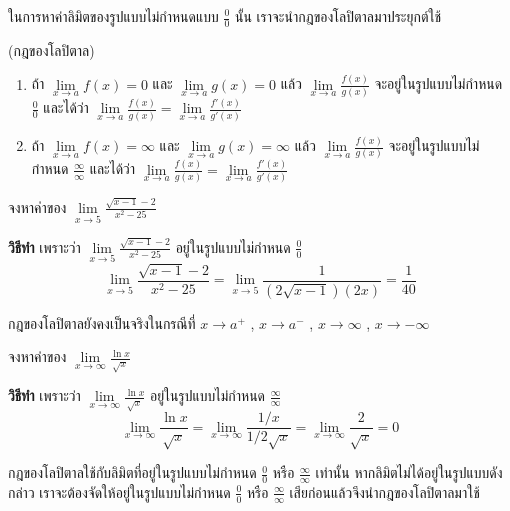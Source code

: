 \documentclass[
]{book}
\begin{document}
ในการหาค่าลิมิตของรูปแบบไม่กำหนดแบบ \(\displaystyle \frac{0}{0}\) นั้น
เราจะนำกฎของโลปิตาลมาประยุกต์ใช้

(กฎของโลปิตาล)\\

\begin{enumerate}
\def\labelenumi{\arabic{enumi}.}
\item
  ถ้า \(\mathop {\lim }\limits_{x\to a} f(x)=0\) และ \(\mathop {\lim
      }\limits_{x\to a} g(x)=0\) แล้ว
  \(\displaystyle \mathop {\lim }\limits_{x\to
      a}
      \frac{f(x)}{g(x)}\) จะอยู่ในรูปแบบไม่กำหนด
  \(\displaystyle \frac{0}{0}\) และได้ว่า
  \(\displaystyle \mathop {\lim }\limits_{x\to a}
      \frac{f(x)}{g(x)}=\mathop {\lim
      }\limits_{x\to a} \frac{{f}'(x)}{{g}'(x)}\)\\
\item
  ถ้า \(\mathop {\lim }\limits_{x\to a} f(x)=\infty\) และ \(\mathop {\lim
      }\limits_{x\to a} g(x)=\infty\) แล้ว \(\displaystyle \mathop {\lim
      }\limits_{x\to a}
      \frac{f(x)}{g(x)}\) จะอยู่ในรูปแบบไม่กำหนด
  \(\displaystyle \frac{\infty
      }{\infty }\) และได้ว่า
  \(\displaystyle \mathop {\lim }\limits_{x\to a}
      \frac{f(x)}{g(x)}=\mathop {\lim
      }\limits_{x\to a} \frac{{f}'(x)}{{g}'(x)}\)
\end{enumerate}

จงหาค่าของ \(\displaystyle \mathop {\lim }\limits_{x\to 5} \frac{\sqrt
{x-1}
-2}{x^2-25}\)

\textbf{วิธีทำ} เพราะว่า
\(\displaystyle \mathop {\lim }\limits_{x\to 5} \frac{\sqrt
{x-1}
-2}{x^2-25}\) อยู่ในรูปแบบไม่กำหนด \(\displaystyle \frac{0}{0}\)
\[\displaystyle \mathop {\lim }\limits_{x\to 5} \frac{\sqrt {x-1} 
-2}{x^2-25}=\mathop {\lim 
}\limits_{x\to 5} \frac{1}{(2\sqrt {x-1} )(2x)}=\frac{1}{40}\]

กฎของโลปิตาลยังคงเป็นจริงในกรณีที่ \(x\to a^+\) , \(x\to a^-\) ,
\(x\to \infty\) , \(x\to -\infty\)

จงหาค่าของ
\(\displaystyle \mathop {\lim }\limits_{x\to \infty } \frac{\ln
x}{\sqrt x }\)

\textbf{วิธีทำ} เพราะว่า
\(\displaystyle \mathop {\lim }\limits_{x\to \infty } \frac{\ln
x}{\sqrt x
}\) อยู่ในรูปแบบไม่กำหนด \(\displaystyle \frac{\infty }{\infty }\)
\[\displaystyle \mathop {\lim }\limits_{x\to \infty } \frac{\ln x}{\sqrt x 
}=\mathop {\lim 
}\limits_{x\to \infty } \frac{1/x}{1/2\sqrt x }=\mathop {\lim }\limits_{x\to 
\infty } \frac{2}{\sqrt x }=0\]

กฎของโลปิตาลใช้กับลิมิตที่อยู่ในรูปแบบไม่กำหนด \(\displaystyle \frac{0}{0}\) หรือ
\(\displaystyle \frac{\infty }{\infty }\) เท่านั้น
หากลิมิตไม่ได้อยู่ในรูปแบบดังกล่าว เราจะต้องจัดให้อยู่ในรูปแบบไม่กำหนด
\(\displaystyle \frac{0}{0}\) หรือ \(\displaystyle \frac{\infty
}{\infty }\) เสียก่อนแล้วจึงนำกฎของโลปิตาลมาใช้
\end{document}
